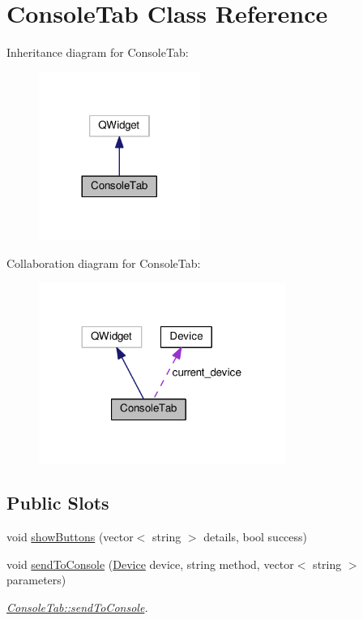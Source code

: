\hypertarget{classConsoleTab}{}\section{Console\+Tab Class Reference}
\label{classConsoleTab}


Inheritance diagram for Console\+Tab\+:\nopagebreak
\begin{figure}[H]
\begin{center}
\leavevmode
\includegraphics[width=149pt]{classConsoleTab__inherit__graph}
\end{center}
\end{figure}


Collaboration diagram for Console\+Tab\+:\nopagebreak
\begin{figure}[H]
\begin{center}
\leavevmode
\includegraphics[width=228pt]{classConsoleTab__coll__graph}
\end{center}
\end{figure}
\subsection*{Public Slots}
\begin{DoxyCompactItemize}
\item 
void \hyperlink{classConsoleTab_abda9ef659782544e72f0e4561c5583f0}{show\+Buttons} (vector$<$ string $>$ details, bool success)
\item 
void \hyperlink{classConsoleTab_a695bb64854ca658dc9cc0a44c7a08f2c}{send\+To\+Console} (\hyperlink{classDevice}{Device} device, string method, vector$<$ string $>$ parameters)
\begin{DoxyCompactList}\small\item\em \hyperlink{classConsoleTab_a695bb64854ca658dc9cc0a44c7a08f2c}{Console\+Tab\+::send\+To\+Console}. \end{DoxyCompactList}\end{DoxyCompactItemize}
